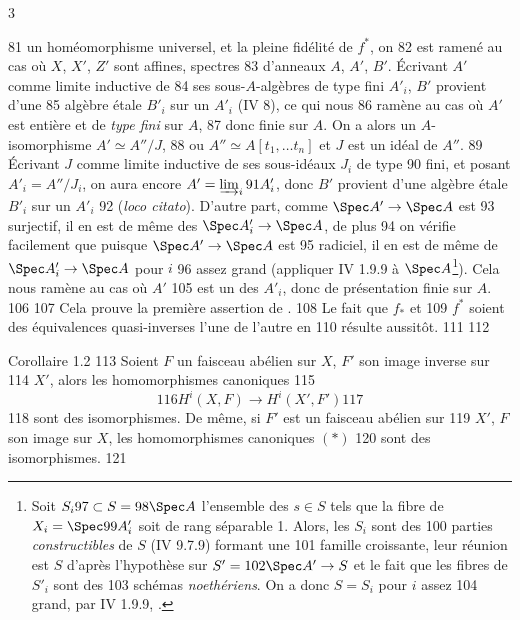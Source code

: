 3	\documentclass[10pt]{../fichiers-configuration-latex/smfart}
\begin{document}
    81	un homéomorphisme universel, et la pleine fidélité de $f^{\ast}$, on
    82	est ramené au cas où $X$, $X'$, $Z'$ sont affines, spectres
    83	d'anneaux $A$, $A'$, $B'$. Écrivant $A'$ comme limite inductive de
    84	ses sous-$A$-algèbres de type fini $A'_{i}$, $B'$ provient d'une
    85	algèbre étale $B'_{i}$ sur un $A'_{i}$ (\cf \EGA IV 8), ce qui nous
    86	ramène au cas où $A'$ est entière et de \emph{type fini} sur $A$,
    87	donc finie sur $A$. On a alors un $A$-isomorphisme $A'\simeq A''/J$,
    88	ou $A'' \simeq A [t_1, \ldots t_n]$ et $J$ est un idéal de $A''$.
    89	Écrivant $J$ comme limite inductive de ses sous-idéaux $J_i$ de type
    90	fini, et posant $A'_i = A'' /J_i$, on aura encore $A' = \varinjlim_i
    91	A'_{i}$, donc $B'$ provient d'une algèbre étale $B'_i$ sur un $A'_i$
    92	(\emph{loco citato}). D'autre part, comme $\Spec A'\to \Spec A$ est
    93	surjectif, il en est de même des $\Spec A'_i \to \Spec A$, de plus
    94	on vérifie facilement que puisque $\Spec A'\to \Spec A$ est
    95	radiciel, il en est de même de $\Spec A'_i \to \Spec A$ pour $i$
    96	assez grand (appliquer \EGA IV 1.9.9 à $\Spec A$\footnote{Soit $S_i
    97	\subset S =
    98	  \Spec A$ l'ensemble des $s \in S$ tels que la fibre de $X_i = \Spec
    99	  A'_i$  soit de rang séparable 1. Alors, les $S_i$ sont des
   100	  parties \emph{constructibles} de $S$ (\EGA IV 9.7.9) formant une
   101	  famille croissante, leur réunion est $S$ d'après l'hypothèse sur $S'=
   102	  \Spec A'\to S$ et le fait que les fibres de $S'_i$ sont des
   103	  schémas \emph{noethériens}. On a donc $S = S_i$ pour $i$ assez
   104	  grand, par \EGA IV 1.9.9, \cqfd.}). Cela nous ramène au cas où $A'$
   105	est un des $A'_i$, donc de présentation finie sur $A$.
   106	
   107	Cela prouve la première assertion de .
   108	Le fait que $f_{\ast}$ et
   109	$f^{\ast}$ soient des équivalences quasi-inverses l'une de l'autre en
   110	résulte aussitôt.
   111	
   112	\begin{enonce*}{Corollaire 1.2}
   113	Soient $F$ un faisceau abélien sur $X$, $F'$ son image inverse sur
   114	$X'$, alors les homomorphismes canoniques
   115	\begin{equation*}
   116	H^{i} (X, F) \to H^{i} (X', F')\tag{$\ast$}
   117	\end{equation*}
   118	sont des isomorphismes. De même, si $F'$ est un faisceau abélien sur
   119	$X'$, $F$ son image sur $X$, les homomorphismes canoniques $(\ast)$
   120	sont des isomorphismes.
   121	\end{enonce*}
\end{document}
